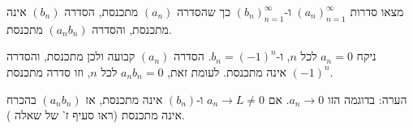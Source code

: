 מצאו סדרות
$(a_n)_{n=1}^{\infty}$
ו-$(b_n)_{n=1}^{\infty}$
כך שהסדרה
$(a_n)$
מתכנסת, הסדרה
$(b_n)$
אינה מתכנסת, והסדרה
$(a_nb_n)$
מתכנסת.
\begin{solbox}
ניקח
$a_n=0$
לכל
$n$,
ו-$b_n=(-1)^n$.
הסדרה
$(a_n)$
קבועה ולכן מתכנסת, והסדרה
$(-1)^n$
אינה מתכנסת. לעומת זאת,
$a_nb_n=0$
לכל
$n$,
וזו סדרה מתכנסת.

הערה: בדוגמה הזו $a_n\to0$. אם $a_n\to L\ne0$ ו-$(b_n)$ אינה מתכנסת, אז $(a_nb_n)$ בהכרח אינה מתכנסת (ראו סעיף ז' של שאלה ).
\end{solbox}
